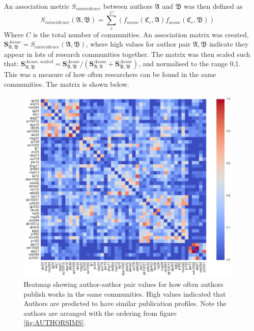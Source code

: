 An association metric $S_{coincidence}$ between authors $\mathfrak{A}$ and $\mathfrak{B}$ was then defined as $$S_{coincidence}\left( \mathfrak{A} , \mathfrak{B} \right) = \sum_c^C \left(f_{assoc} \left( \mathfrak{C}_c , \mathfrak{A} \right) f_{assoc}\left( \mathfrak{C}_c , \mathfrak{B} \right) \right) $$
Where $C$ is the total number of communities. An association matrix was created, $\mathbf{S}^{Assoc}_{\mathfrak{A} , \mathfrak{B}} = S_{coincidence}\left( \mathfrak{A} , \mathfrak{B} \right)$, where high values for author pair $\mathfrak{A} , \mathfrak{B}$ indicate they appear in lots of research communities together. The matrix was then scaled such that: $\mathbf{S}^{Assoc,scaled}_{\mathfrak{A} , \mathfrak{B}} =  \mathbf{S}^{Assoc}_{\mathfrak{A} , \mathfrak{B}} /  \left( \mathbf{S}^{Assoc}_{\mathfrak{A} , \mathfrak{A}} + \mathbf{S}^{Assoc}_{\mathfrak{B} , \mathfrak{B}} \right) $, and normalised to the range 0,1. This was a measure of how often researchers can be found in the same communities. The matrix is shown below. 
\begin{center}
\begin{figure}[H]
\label{fig:commHEATMAP}
  \centering
    \includegraphics[scale=0.8]{Analysis/author_comm_heatmap.png}
    \caption{Heatmap showing author-author pair values for how often authors publish works in the same communities. High values indicated that Authors are predicted to have similar publication profiles. Note the authors are arranged with the ordering from figure \ref{fig:AUTHORSIMS}.}
\end{figure} 
\end{center}
